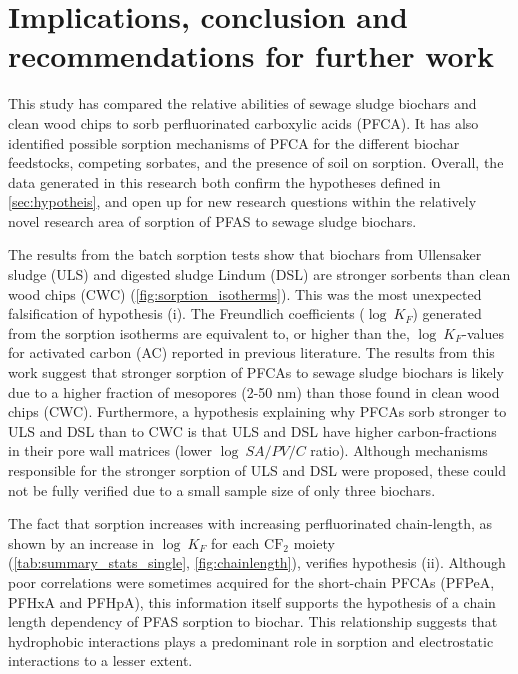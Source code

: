 \chapter{Implications, conclusion and recommendations for further work}\label{chap:Conclusion}
This study has compared the relative abilities of sewage sludge biochars and clean wood chips to sorb perfluorinated carboxylic acids (PFCA). It has also identified possible sorption mechanisms of PFCA for the different biochar feedstocks, competing sorbates, and the presence of soil on sorption. Overall, the data generated in this research both confirm the hypotheses defined in \cref{sec:hypotheis}, and open up for new research questions within the relatively novel research area of sorption of PFAS to sewage sludge biochars.

The results from the batch sorption tests show that biochars from Ullensaker sludge (ULS) and digested sludge Lindum (DSL) are stronger sorbents than clean wood chips (CWC) (\cref{fig:sorption_isotherms}). This was the most unexpected falsification of hypothesis (i). The Freundlich coefficients ($\log~K_F$) generated from the sorption isotherms are equivalent to, or higher than the, $\log~K_F$-values for activated carbon (AC) reported in previous literature. The results from this work suggest that stronger sorption of PFCAs to sewage sludge biochars is likely due to a higher fraction of mesopores (2-50 nm) than those found in clean wood chips (CWC). Furthermore, a hypothesis explaining why PFCAs sorb stronger to ULS and DSL than to CWC is that ULS and DSL have higher carbon-fractions in their pore wall matrices (lower $\log~SA/PV/C$ ratio). Although mechanisms responsible for the stronger sorption of ULS and DSL were proposed, these could not be fully verified due to a small sample size of only three biochars. 

The fact that sorption increases with increasing perfluorinated chain-length, as shown by an increase in $\log~K_F$ for each $\mathrm{CF_2}$ moiety (\cref{tab:summary_stats_single}, \cref{fig:chainlength}), verifies hypothesis (ii). Although poor correlations were sometimes acquired for the short-chain PFCAs (PFPeA, PFHxA and PFHpA), this information itself supports the hypothesis of a chain length dependency of PFAS sorption to biochar. This relationship suggests that hydrophobic interactions plays a predominant role in sorption and electrostatic interactions to a lesser extent. 

